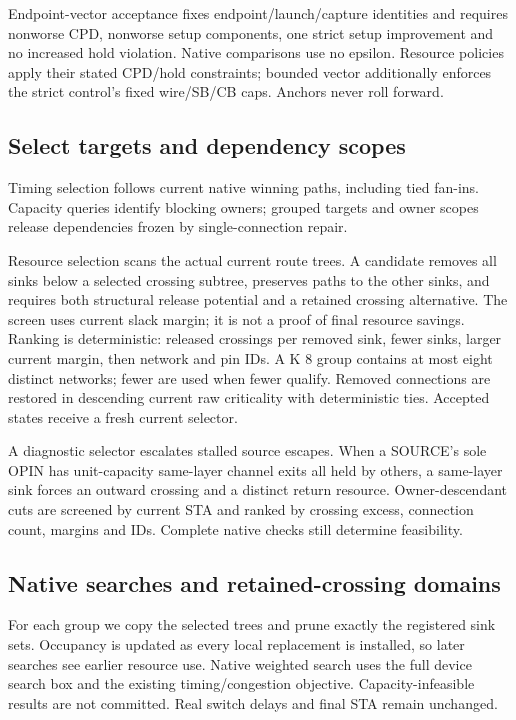 \documentclass[conference,10pt]{IEEEtran}
\begin{document}
Endpoint-vector acceptance fixes endpoint/launch/capture identities and requires nonworse CPD, nonworse setup components, one strict setup improvement and no increased hold violation. Native comparisons use no epsilon. Resource policies apply their stated CPD/hold constraints; bounded vector additionally enforces the strict control's fixed wire/SB/CB caps. Anchors never roll forward.


\subsection{Select targets and dependency scopes}
Timing selection follows current native winning paths, including tied fan-ins. Capacity queries identify blocking owners; grouped targets and owner scopes release dependencies frozen by single-connection repair.

Resource selection scans the actual current route trees. A candidate removes all sinks below a selected crossing subtree, preserves paths to the other sinks, and requires both structural release potential and a retained crossing alternative. The screen uses current slack margin; it is not a proof of final resource savings. Ranking is deterministic: released crossings per removed sink, fewer sinks, larger current margin, then network and pin IDs. A K 8 group contains at most eight distinct networks; fewer are used when fewer qualify. Removed connections are restored in descending current raw criticality with deterministic ties. Accepted states receive a fresh current selector.

A diagnostic selector escalates stalled source escapes. When a SOURCE's sole OPIN has unit-capacity same-layer channel exits all held by others, a same-layer sink forces an outward crossing and a distinct return resource. Owner-descendant cuts are screened by current STA and ranked by crossing excess, connection count, margins and IDs. Complete native checks still determine feasibility.

\subsection{Native searches and retained-crossing domains}
For each group we copy the selected trees and prune exactly the registered sink sets. Occupancy is updated as every local replacement is installed, so later searches see earlier resource use. Native weighted search uses the full device search box and the existing timing/congestion objective. Capacity-infeasible results are not committed. Real switch delays and final STA remain unchanged.
\end{document}
